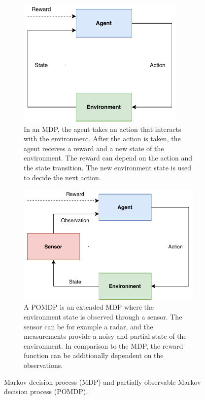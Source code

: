 \documentclass[english, 12pt, a4paper, elec, utf8, a-1b, online]{aaltothesis}
\numberwithin{equation}{section}
\begin{document}
\begin{figure}
    \centering
    \begin{subfigure}[b]{0.45\textwidth}
        \centering
        \includegraphics[width=0.9\textwidth]{figures/MDP.pdf}
        \caption{
        In an MDP, the agent takes an action that interacts with the environment.
        After the action is taken, the agent receives a reward and a new state of the environment.
        The reward can depend on the action and the state transition.
        The new environment state is used to decide the next action.}
        \label{fig:mdp}
    \end{subfigure}
    \hfill
    \begin{subfigure}[b]{0.45\textwidth}
        \centering
        \includegraphics[width=\textwidth]{figures/POMDP.pdf}
        \caption{
        A POMDP is an extended MDP where the environment state is observed through a sensor.
        The sensor can be for example a radar, and the measurements provide a noisy and partial state of the environment. 
        In comparison to the MDP, the reward function can be additionally dependent on the observations.
        }
        \label{fig:pomdp}
    \end{subfigure}
    \caption{Markov decision process (MDP) and partially observable Markov decision process (POMDP). }
    \label{fig:MDP_and_POMDP}
\end{figure}
\end{document}
